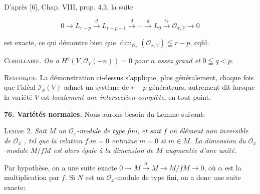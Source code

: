 %
%
%
D'après [6], Chap. VIII, prop. 4.3, la suite

\begin{equation*}
0 \rightarrow L_{r-p} \overset{d}{\longrightarrow} L_{r-p-1} \overset{d}{\longrightarrow} \cdots \overset{d}{\longrightarrow} L_0 \overset{\varepsilon_x}{\longrightarrow} \mathcal{O}_{x,V} \rightarrow 0
\end{equation*}

est exacte, ce qui démontre bien que $\dim_{\mathcal{O}_x} (\mathcal{O}_{x,V}) \leqq r - p$, cqfd.

\textsc{Corollaire}. \textit{On a} $H^q(V, \mathcal{O}_V(-n)) = 0$ \textit{pour $n$ assez grand et} $0 \leqq q < p$.

\textsc{Remarque}. La démonstration ci-dessus s'applique, plus généralement, chaque fois que l'idéal $\mathcal{I}_x(V)$ admet un système de $r - p$ générateurs, autrement dit lorsque la variété $V$ est \textit{localement une intersection complète}, en tout point.

\textbf{76. Variétés normales.} Nous aurons besoin du Lemme suivant:

\textsc{Lemme} 2. \textit{Soit $M$ un $\mathcal{O}_x$-module de type fini, et soit $f$ un élément non inversible de $\mathcal{O}_x$ , tel que la relation $f.m = 0$ entraîne $m = 0$ si $m \in M$. La dimension du $\mathcal{O}_x$-module $M/fM$ est alors égale à la dimension de $M$ augmentée d'une unité.}

Par hypothèse, on a une suite exacte $0 \rightarrow M \overset{\alpha}{\rightarrow} M \rightarrow M/fM \rightarrow 0$, où $\alpha$ est la multiplication par $f$. Si $N$ est un $\mathcal{O}_x$-module de type fini, on a donc une suite exacte:

